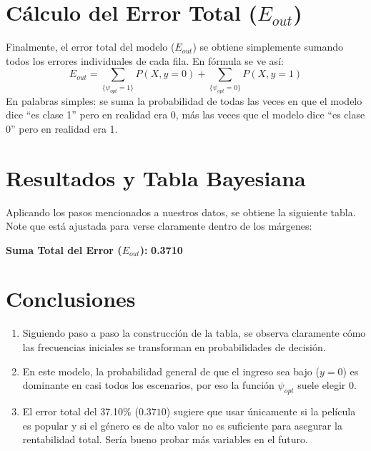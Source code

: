\documentclass[12pt,a4paper]{article}
\begin{document}
\section{C\'alculo del Error Total ($E_{out}$)}
Finalmente, el error total del modelo ($E_{out}$) se obtiene simplemente sumando todos los errores individuales de cada fila. En f\'ormula se ve as\'i:
\begin{equation}
  E_{out} = \sum_{\{\psi_{opt}=1\}} P(X, y=0) + \sum_{\{\psi_{opt}=0\}} P(X, y=1)
\end{equation}
En palabras simples: se suma la probabilidad de todas las veces en que el modelo dice ``es clase 1'' pero en realidad era 0, m\'as las veces que el modelo dice ``es clase 0'' pero en realidad era 1.

\section{Resultados y Tabla Bayesiana}
Aplicando los pasos mencionados a nuestros datos, se obtiene la siguiente tabla. Note que est\'a ajustada para verse claramente dentro de los m\'argenes:
\begin{table}[H]\centering
{}
\caption{Resultados del clasificador bayesiano paso a paso.}
\end{table}

\textbf{Suma Total del Error ($E_{out}$):} \textbf{0.3710}

\section{Conclusiones}
\begin{enumerate}
  \item Siguiendo paso a paso la construcci\'on de la tabla, se observa claramente c\'omo las frecuencias iniciales se transforman en probabilidades de decisi\'on.
  \item En este modelo, la probabilidad general de que el ingreso sea bajo ($y=0$) es dominante en casi todos los escenarios, por eso la funci\'on $\psi_{opt}$ suele elegir 0.
  \item El error total del 37.10\% ($0.3710$) sugiere que usar \'unicamente si la pel\'icula es popular y si el g\'enero es de alto valor no es suficiente para asegurar la rentabilidad total. Ser\'ia bueno probar m\'as variables en el futuro.
\end{enumerate}
\end{document}
